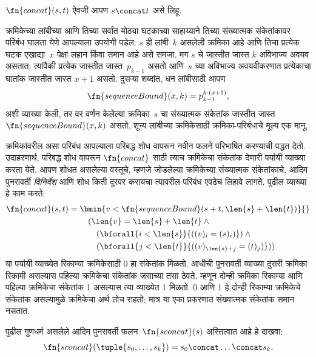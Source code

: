 \documentclass[../../../include/open-logic-section]{subfiles}
\begin{document}
$\fn{concat}(s,t)$ ऐवजी आपण $s \concat t$ असे लिहू.

क्रमिकेच्या लांबीच्या आणि तिच्या सर्वांत मोठ्या घटकाच्या साहाय्याने तिच्या
संख्यात्मक संकेतांकावर परिबंध घालता येणे आपल्याला उपयोगी पडेल. $s$ ही
लांबी~$k$ असलेली क्रमिका आहे आणि तिचा प्रत्येक घटक एखाद्या~$x$ पेक्षा
लहान किंवा समान आहे असे समजा. मग $s$ चे जास्तीत जास्त $k$ अविभाज्य अवयव
असतात; त्यांपैकी प्रत्येक जास्तीत जास्त~$p_{k-1}$ असतो आणि~$s$ च्या
अविभाज्य अवयवीकरणात प्रत्येकाचा घातांक जास्तीत जास्त $x+1$ असतो. दुसऱ्या
शब्दांत, धन लांबीसाठी आपण
\[
\fn{sequenceBound}(x,k) = p_{k-1}^{k \cdot (x+1)},
\]
अशी व्याख्या केली, तर वर वर्णन केलेल्या क्रमिका~$s$ चा संख्यात्मक संकेतांक
जास्तीत जास्त~$\fn{sequenceBound}(x,k)$ असतो. शून्य लांबीच्या क्रमिकेसाठी
क्रमिका-परिबंधाचे मूल्य एक मानू.

क्रमिकांवरील असा परिबंध आपल्याला परिबद्ध शोध वापरून नवीन फलने परिभाषित
करण्याची पद्धत देतो. उदाहरणार्थ, परिबद्ध शोध वापरून $\fn{concat}$ साठी
त्याच क्रमिकेचा संकेतांक देणारी पर्यायी व्याख्या करता येते. आपण शोधत असलेल्या वस्तूचे, म्हणजे जोडलेल्या क्रमिकेच्या
संख्यात्मक संकेतांकाचे, आदिम पुनरावर्ती \emph{विनिर्देश} आणि शोध किती दूरवर
करायचा त्यावरील परिबंध एवढेच लिहावे लागते. पुढील व्याख्या हे काम करते:
\begin{align*}
  \fn{concat}(s,t) = {} & \bmin{v < \fn{sequenceBound}(s+t,\len{s} +
    \len{t})}{} \\
  & \quad(\len{v} = \len{s} + \len{t} \land {}\\
    & \qquad (\bforall{i < \len{s}}{((v)_i = (s)_i)}) \land {} \\
      & \qquad (\bforall{j < \len{t}}{((v)_{\len{s}+j} = (t)_j)}))
\end{align*}
या पर्यायी व्याख्येत रिकाम्या क्रमिकेसाठी 0 हा संकेतांक मिळतो. आधीची
पुनरावर्ती व्याख्या दुसरी क्रमिका रिकामी असल्यास पहिल्या क्रमिकेचा
संकेतांक जसाच्या तसा ठेवते. म्हणून दोन्ही क्रमिका रिकाम्या आणि पहिल्या
क्रमिकेचा संकेतांक 1 असल्यास त्या व्याख्येत 1 मिळतो. 0 आणि 1 हे दोन्ही
रिकाम्या क्रमिकेचे संकेतांक असल्यामुळे क्रमिकेचा अर्थ तोच राहतो; मात्र
या एका प्रकरणात संख्यात्मक संकेतांक समान नसतात.

\begin{prob}
पुढील गुणधर्म असलेले आदिम पुनरावर्ती फलन~$\fn{sconcat}(s)$ अस्तित्वात आहे
हे दाखवा:
\[
\fn{sconcat}(\tuple{s_0, \dots, s_k}) = s_0 \concat \dots \concat s_k.
\]
\end{prob}
\end{document}
